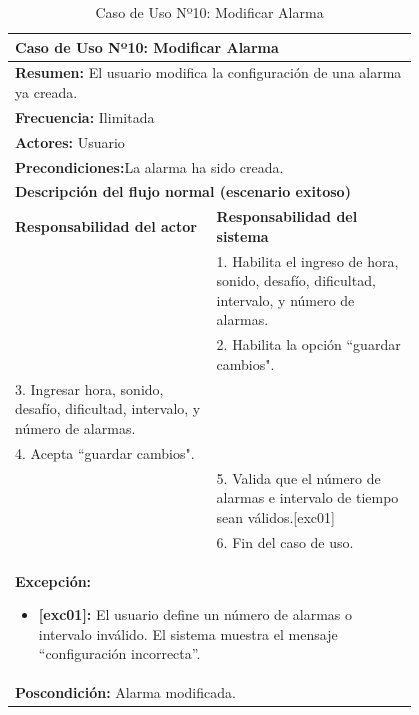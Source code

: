 \begin{table}[H]
    \centering
    \caption{Caso de Uso Nº10: Modificar Alarma}
    
    \begin{tabular}{| p{0.4\linewidth} | p{0.4\linewidth} |}
        \hline
        \multicolumn{2}{|l|}{\textbf{Caso de Uso Nº10:} Modificar Alarma} \\
        \hline
        \multicolumn{2}{|l|}{\textbf{Resumen:} El usuario modifica la configuración de una alarma ya creada.} \\
        \hline
        \multicolumn{2}{|l|}{\textbf{Frecuencia:}  Ilimitada} \\
        \hline
        \multicolumn{2}{|l|}{\textbf{Actores:}  Usuario} \\
        \hline
        \multicolumn{2}{|l|}{\textbf{Precondiciones:}La alarma ha sido creada.} \\
        \hline
        \multicolumn{2}{|l|}{\textbf{Descripción del flujo normal (escenario exitoso)} } \\
        \hline
        \textbf{Responsabilidad del actor} & \textbf{Responsabilidad del sistema}\\
            & 1. Habilita el ingreso de hora, sonido, desafío, dificultad, intervalo, y número de alarmas.\\
            & 2. Habilita la opción ``guardar cambios". \\
             3. Ingresar hora, sonido, desafío, dificultad, intervalo, y número de alarmas. &\\
            4. Acepta ``guardar cambios". &\\
            & 5. Valida que el número de alarmas e intervalo de tiempo sean válidos.[exc01] \\
            & 6. Fin del caso de uso. \\
        \hline
        \multicolumn{2}{|p{0.8\linewidth}|}{
                \textbf{Excepción:}
                \begin{itemize}
                    \item \textbf{[exc01]:}  El usuario define un número de alarmas o intervalo inválido. El sistema muestra el mensaje ``configuración incorrecta”.
                \end{itemize}}\\
        \hline
        \multicolumn{2}{|l|}{\textbf{Poscondición:}  Alarma modificada.} \\
        \hline
    \end{tabular}

    \label{table:10}
\end{table}


